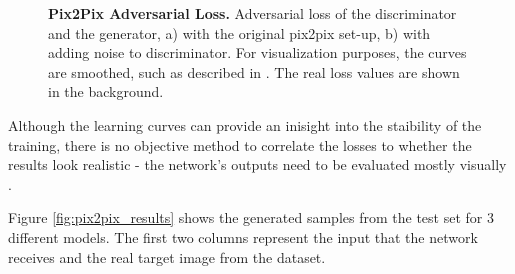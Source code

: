 \documentclass[12pt]{report}
\begin{document}
\begin{figure}[t]
\centering
{}
\caption{\label{fig:pix2pix_losses} \textbf{Pix2Pix Adversarial Loss.} Adversarial loss of the discriminator and the generator, a) with the original pix2pix set-up, b) with adding noise to discriminator. For visualization purposes, the curves are smoothed, such as described in \cite{noauthor_tensorflows_2018}. The real loss values are shown in the background.}
\end{figure}

Although the learning curves can provide an inisight into the staibility of the training, there is no objective method to correlate the losses to whether the results look realistic - the network's outputs need to be evaluated mostly visually \cite{preserve_knowledge_how_nodate}. 

Figure \ref{fig:pix2pix_results} shows the generated samples from the test set for 3 different models. The first two columns represent the input that the network receives and the real target image from the dataset. 
\end{document}
